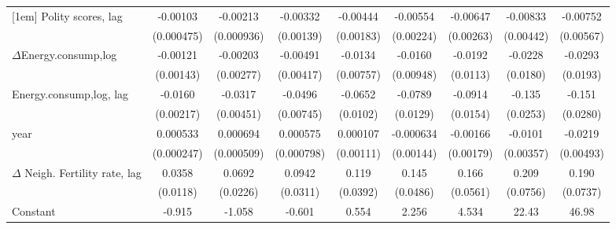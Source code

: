 \begin{table}[htbp]
\begin{tabular}{l*{8}{c}}
[1em]
Polity scores, lag             &    -0.00103\sym{**} &    -0.00213\sym{**} &    -0.00332\sym{**} &    -0.00444\sym{**} &    -0.00554\sym{**} &    -0.00647\sym{**} &    -0.00833\sym{*}  &    -0.00752         \\
                    &  (0.000475)         &  (0.000936)         &   (0.00139)         &   (0.00183)         &   (0.00224)         &   (0.00263)         &   (0.00442)         &   (0.00567)         \\
[1em]
$\Delta$Energy.consump,log            &    -0.00121         &    -0.00203         &    -0.00491         &     -0.0134\sym{*}  &     -0.0160\sym{*}  &     -0.0192\sym{*}  &     -0.0228         &     -0.0293         \\
                    &   (0.00143)         &   (0.00277)         &   (0.00417)         &   (0.00757)         &   (0.00948)         &    (0.0113)         &    (0.0180)         &    (0.0193)         \\
[1em]
Energy.consump,log, lag            &     -0.0160\sym{***}&     -0.0317\sym{***}&     -0.0496\sym{***}&     -0.0652\sym{***}&     -0.0789\sym{***}&     -0.0914\sym{***}&      -0.135\sym{***}&      -0.151\sym{***}\\
                    &   (0.00217)         &   (0.00451)         &   (0.00745)         &    (0.0102)         &    (0.0129)         &    (0.0154)         &    (0.0253)         &    (0.0280)         \\
[1em]
year                &    0.000533\sym{**} &    0.000694         &    0.000575         &    0.000107         &   -0.000634         &    -0.00166         &     -0.0101\sym{***}&     -0.0219\sym{***}\\
                    &  (0.000247)         &  (0.000509)         &  (0.000798)         &   (0.00111)         &   (0.00144)         &   (0.00179)         &   (0.00357)         &   (0.00493)         \\
[1em]
$\Delta$ Neigh. Fertility rate, lag&      0.0358\sym{***}&      0.0692\sym{***}&      0.0942\sym{***}&       0.119\sym{***}&       0.145\sym{***}&       0.166\sym{***}&       0.209\sym{***}&       0.190\sym{**} \\
                    &    (0.0118)         &    (0.0226)         &    (0.0311)         &    (0.0392)         &    (0.0486)         &    (0.0561)         &    (0.0756)         &    (0.0737)         \\
[1em]
Constant            &      -0.915\sym{*}  &      -1.058         &      -0.601         &       0.554         &       2.256         &       4.534         &       22.43\sym{***}&       46.98\sym{***}\\

\end{tabular}
\end{table}
